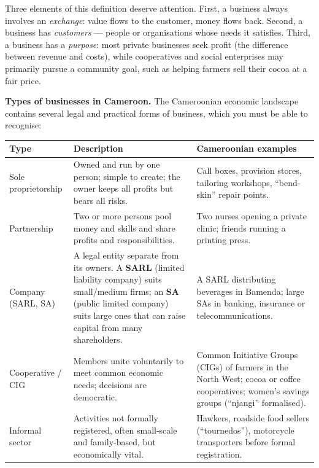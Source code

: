 \documentclass[11pt]{article}
\begin{document}
Three elements of this definition deserve attention. First, a business always involves an \emph{exchange}: value flows to the customer, money flows back. Second, a business has \emph{customers} — people or organisations whose needs it satisfies. Third, a business has a \emph{purpose}: most private businesses seek profit (the difference between revenue and costs), while cooperatives and social enterprises may primarily pursue a community goal, such as helping farmers sell their cocoa at a fair price.

\textbf{Types of businesses in Cameroon.} The Cameroonian economic landscape contains several legal and practical forms of business, which you must be able to recognise:

\begin{center}
\begin{tabularx}{\linewidth}{|l|X|X|}
\hline
\rowcolor{popblueL} \textbf{Type} & \textbf{Description} & \textbf{Cameroonian examples} \\
\hline
Sole proprietorship & Owned and run by one person; simple to create; the owner keeps all profits but bears all risks. & Call boxes, provision stores, tailoring workshops, ``bend-skin'' repair points. \\
\hline
Partnership & Two or more persons pool money and skills and share profits and responsibilities. & Two nurses opening a private clinic; friends running a printing press. \\
\hline
Company (SARL, SA) & A legal entity separate from its owners. A \textbf{SARL} (limited liability company) suits small/medium firms; an \textbf{SA} (public limited company) suits large ones that can raise capital from many shareholders. & A SARL distributing beverages in Bamenda; large SAs in banking, insurance or telecommunications. \\
\hline
Cooperative / CIG & Members unite voluntarily to meet common economic needs; decisions are democratic. & Common Initiative Groups (CIGs) of farmers in the North West; cocoa or coffee cooperatives; women's savings groups (``njangi'' formalised). \\
\hline
Informal sector & Activities not formally registered, often small-scale and family-based, but economically vital. & Hawkers, roadside food sellers (``tournedos''), motorcycle transporters before formal registration. \\
\hline
\end{tabularx}
\end{center}
\end{document}
